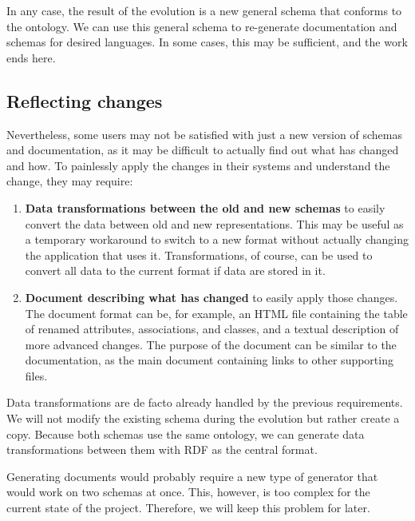 In any case, the result of the evolution is a new general schema that conforms to the ontology. We can use this general schema to re-generate documentation and schemas for desired languages. In some cases, this may be sufficient, and the work ends here.

\subsection*{Reflecting changes}

Nevertheless, some users may not be satisfied with just a new version of schemas and documentation, as it may be difficult to actually find out what has changed and how. To painlessly apply the changes in their systems and understand the change, they may require:

\begin{enumerate}
    \item \textbf{Data transformations between the old and new schemas} to easily convert the data between old and new representations. This may be useful as a temporary workaround to switch to a new format without actually changing the application that uses it. Transformations, of course, can be used to convert all data to the current format if data are stored in it.
    \item \textbf{Document describing what has changed} to easily apply those changes. The document format can be, for example, an HTML file containing the table of renamed attributes, associations, and classes, and a textual description of more advanced changes. The purpose of the document can be similar to the documentation, as the main document containing links to other supporting files.
\end{enumerate}

Data transformations are de facto already handled by the previous requirements. We will not modify the existing schema during the evolution but rather create a copy. Because both schemas use the same ontology, we can generate data transformations between them with RDF as the central format.

Generating documents would probably require a new type of generator that would work on two schemas at once. This, however, is too complex for the current state of the project. Therefore, we will keep this problem for later.
